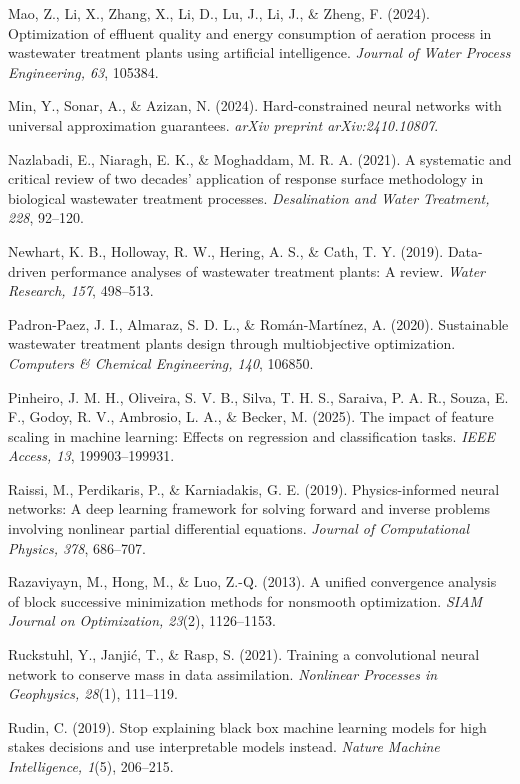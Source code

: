 \documentclass[a4paper,fleqn]{cas-sc}
\begin{document}
\noindent Mao, Z., Li, X., Zhang, X., Li, D., Lu, J., Li, J., \& Zheng, F. (2024). Optimization of effluent quality and energy consumption of aeration process in wastewater treatment plants using artificial intelligence. \textit{Journal of Water Process Engineering, 63}, 105384.

\noindent Min, Y., Sonar, A., \& Azizan, N. (2024). Hard-constrained neural networks with universal approximation guarantees. \textit{arXiv preprint arXiv:2410.10807}.

\noindent Nazlabadi, E., Niaragh, E. K., \& Moghaddam, M. R. A. (2021). A systematic and critical review of two decades' application of response surface methodology in biological wastewater treatment processes. \textit{Desalination and Water Treatment, 228}, 92--120.

\noindent Newhart, K. B., Holloway, R. W., Hering, A. S., \& Cath, T. Y. (2019). Data-driven performance analyses of wastewater treatment plants: A review. \textit{Water Research, 157}, 498--513.

\noindent Padron-Paez, J. I., Almaraz, S. D. L., \& Rom\'an-Mart\'inez, A. (2020). Sustainable wastewater treatment plants design through multiobjective optimization. \textit{Computers \& Chemical Engineering, 140}, 106850.

\noindent Pinheiro, J. M. H., Oliveira, S. V. B., Silva, T. H. S., Saraiva, P. A. R., Souza, E. F., Godoy, R. V., Ambrosio, L. A., \& Becker, M. (2025). The impact of feature scaling in machine learning: Effects on regression and classification tasks. \textit{IEEE Access, 13}, 199903--199931.

\noindent Raissi, M., Perdikaris, P., \& Karniadakis, G. E. (2019). Physics-informed neural networks: A deep learning framework for solving forward and inverse problems involving nonlinear partial differential equations. \textit{Journal of Computational Physics, 378}, 686--707.

\noindent Razaviyayn, M., Hong, M., \& Luo, Z.-Q. (2013). A unified convergence analysis of block successive minimization methods for nonsmooth optimization. \textit{SIAM Journal on Optimization, 23}(2), 1126--1153.

\noindent Ruckstuhl, Y., Janji\'{c}, T., \& Rasp, S. (2021). Training a convolutional neural network to conserve mass in data assimilation. \textit{Nonlinear Processes in Geophysics, 28}(1), 111--119.

\noindent Rudin, C. (2019). Stop explaining black box machine learning models for high stakes decisions and use interpretable models instead. \textit{Nature Machine Intelligence, 1}(5), 206--215.
\end{document}
